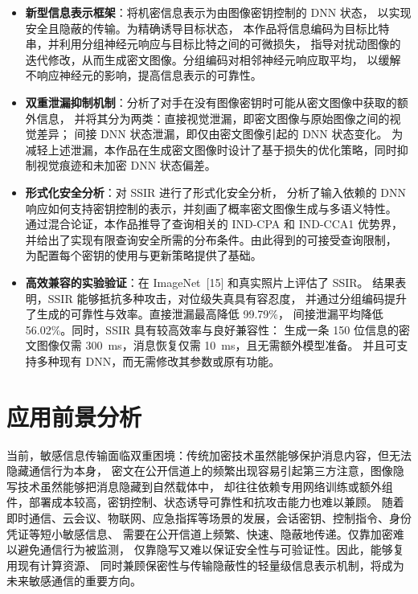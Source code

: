 \begin{itemize}
    \item \textbf{新型信息表示框架}：将机密信息表示为由图像密钥控制的 DNN 状态，
    以实现安全且隐蔽的传输。为精确诱导目标状态，
    本作品将信息编码为目标比特串，并利用分组神经元响应与目标比特之间的可微损失，
    指导对扰动图像的迭代修改，从而生成密文图像。分组编码对相邻神经元响应取平均，
    以缓解不响应神经元的影响，提高信息表示的可靠性。

    \item \textbf{双重泄漏抑制机制}：分析了对手在没有图像密钥时可能从密文图像中获取的额外信息，
    并将其分为两类：直接视觉泄漏，即密文图像与原始图像之间的视觉差异；
    间接 DNN 状态泄漏，即仅由密文图像引起的 DNN 状态变化。
    为减轻上述泄漏，本作品在生成密文图像时设计了基于损失的优化策略，同时抑制视觉痕迹和未加密 DNN 状态偏差。

    \item \textbf{形式化安全分析}：对 SSIR 进行了形式化安全分析，
    分析了输入依赖的 DNN 响应如何支持密钥控制的表示，并刻画了概率密文图像生成与多语义特性。
    通过混合论证，本作品推导了查询相关的 IND-CPA 和 IND-CCA1 优势界，
    并给出了实现有限查询安全所需的分布条件。由此得到的可接受查询限制，
    为配置每个密钥的使用与更新策略提供了基础。

    \item \textbf{高效兼容的实验验证}：在 ImageNet~[15] 和真实照片上评估了 SSIR。
    结果表明，SSIR 能够抵抗多种攻击，对位级失真具有容忍度，
    并通过分组编码提升了生成的可靠性与效率。直接泄漏最高降低 99.79\%，
    间接泄漏平均降低 56.02\%。同时，SSIR 具有较高效率与良好兼容性：
    生成一条 150 位信息的密文图像仅需 300~ms，消息恢复仅需 10~ms，且无需额外模型准备。
    并且可支持多种现有 DNN，而无需修改其参数或原有功能。
\end{itemize}
\section{应用前景分析}
当前，敏感信息传输面临双重困境：传统加密技术虽然能够保护消息内容，但无法隐藏通信行为本身，
密文在公开信道上的频繁出现容易引起第三方注意，图像隐写技术虽然能够把消息隐藏到自然载体中，
却往往依赖专用网络训练或额外组件，部署成本较高，密钥控制、状态诱导可靠性和抗攻击能力也难以兼顾。
随着即时通信、云会议、物联网、应急指挥等场景的发展，会话密钥、控制指令、身份凭证等短小敏感信息、
需要在公开信道上频繁、快速、隐蔽地传递。仅靠加密难以避免通信行为被监测，
仅靠隐写又难以保证安全性与可验证性。因此，能够复用现有计算资源、
同时兼顾保密性与传输隐蔽性的轻量级信息表示机制，将成为未来敏感通信的重要方向。

